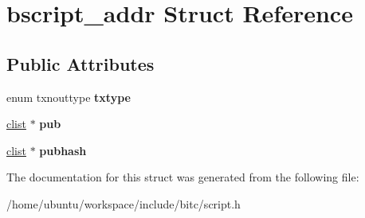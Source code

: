 \hypertarget{structbscript__addr}{\section{bscript\-\_\-addr Struct Reference}
\label{structbscript__addr}
}
\subsection*{Public Attributes}
\begin{DoxyCompactItemize}
\item 
\hypertarget{structbscript__addr_a5a8c081e491784f88ebee6ec3046467d}{enum txnouttype {\bfseries txtype}}\label{structbscript__addr_a5a8c081e491784f88ebee6ec3046467d}

\item 
\hypertarget{structbscript__addr_ac19fd502c884cce45aaeb41535d80aec}{\hyperlink{structclist}{clist} $\ast$ {\bfseries pub}}\label{structbscript__addr_ac19fd502c884cce45aaeb41535d80aec}

\item 
\hypertarget{structbscript__addr_a5f9e7cc2ab1e94c99dd467a189300e5d}{\hyperlink{structclist}{clist} $\ast$ {\bfseries pubhash}}\label{structbscript__addr_a5f9e7cc2ab1e94c99dd467a189300e5d}

\end{DoxyCompactItemize}


The documentation for this struct was generated from the following file\-:\begin{DoxyCompactItemize}
\item 
/home/ubuntu/workspace/include/bitc/script.\-h\end{DoxyCompactItemize}
